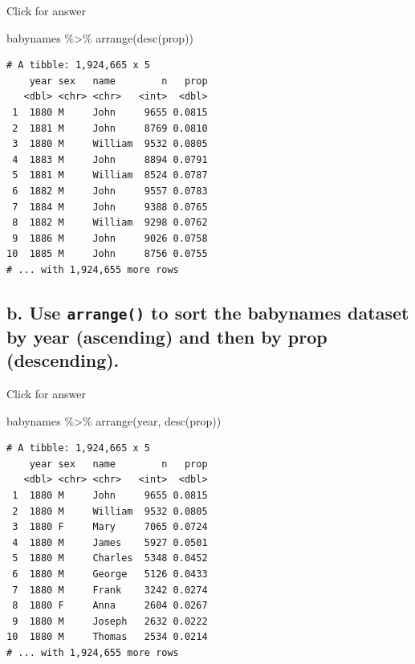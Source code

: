 \documentclass[
]{book}
\newenvironment{Shaded}{\begin{snugshade}}{\end{snugshade}}
\newcommand{\FunctionTok}[1]{\textcolor[rgb]{0.00,0.00,0.00}{#1}}
\newcommand{\NormalTok}[1]{#1}
\newcommand{\SpecialCharTok}[1]{\textcolor[rgb]{0.00,0.00,0.00}{#1}}
\begin{document}
Click for answer

\begin{Shaded}
\begin{Highlighting}[]
\NormalTok{babynames }\SpecialCharTok{\%\textgreater{}\%} \FunctionTok{arrange}\NormalTok{(}\FunctionTok{desc}\NormalTok{(prop))}
\end{Highlighting}
\end{Shaded}

\begin{verbatim}
# A tibble: 1,924,665 x 5
    year sex   name        n   prop
   <dbl> <chr> <chr>   <int>  <dbl>
 1  1880 M     John     9655 0.0815
 2  1881 M     John     8769 0.0810
 3  1880 M     William  9532 0.0805
 4  1883 M     John     8894 0.0791
 5  1881 M     William  8524 0.0787
 6  1882 M     John     9557 0.0783
 7  1884 M     John     9388 0.0765
 8  1882 M     William  9298 0.0762
 9  1886 M     John     9026 0.0758
10  1885 M     John     8756 0.0755
# ... with 1,924,655 more rows
\end{verbatim}

\hypertarget{b.-use-arrange-to-sort-the-babynames-dataset-by-year-ascending-and-then-by-prop-descending.}{%
\subsection{\texorpdfstring{b. Use \texttt{arrange()} to sort the babynames dataset by year (ascending) and then by prop (descending).}{b. Use arrange() to sort the babynames dataset by year (ascending) and then by prop (descending).}}\label{b.-use-arrange-to-sort-the-babynames-dataset-by-year-ascending-and-then-by-prop-descending.}}

Click for answer

\begin{Shaded}
\begin{Highlighting}[]
\NormalTok{babynames }\SpecialCharTok{\%\textgreater{}\%} \FunctionTok{arrange}\NormalTok{(year, }\FunctionTok{desc}\NormalTok{(prop))}
\end{Highlighting}
\end{Shaded}

\begin{verbatim}
# A tibble: 1,924,665 x 5
    year sex   name        n   prop
   <dbl> <chr> <chr>   <int>  <dbl>
 1  1880 M     John     9655 0.0815
 2  1880 M     William  9532 0.0805
 3  1880 F     Mary     7065 0.0724
 4  1880 M     James    5927 0.0501
 5  1880 M     Charles  5348 0.0452
 6  1880 M     George   5126 0.0433
 7  1880 M     Frank    3242 0.0274
 8  1880 F     Anna     2604 0.0267
 9  1880 M     Joseph   2632 0.0222
10  1880 M     Thomas   2534 0.0214
# ... with 1,924,655 more rows
\end{verbatim}
\end{document}

